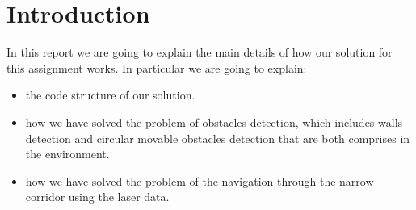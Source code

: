 \section{Introduction}
In this report we are going to explain the main details of how our solution for this assignment works. In particular we are going to explain:
\begin{itemize}
    \item  the code structure of our solution.
    \item  how we have solved the problem of obstacles detection, which includes walls detection and circular movable obstacles detection that are both comprises in the environment.
    \item how we have solved the problem of the navigation through the narrow corridor using the laser data.
\end{itemize}